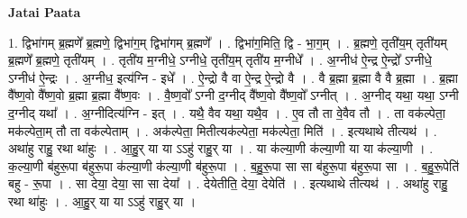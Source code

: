 \documentclass[17pt]{extarticle}
\begin{document}
\textbf{Jatai Paata} \newline

1. द्विभा॑गम् ब्र॒ह्मणे᳚ ब्र॒ह्मणे॒ द्विभा॑ग॒म् द्विभा॑गम् ब्र॒ह्मणे᳚ । . द्विभा॑ग॒मिति॒ द्वि - भा॒ग॒म् । . ब्र॒ह्मणे॒ तृती॑य॒म् तृती॑यम् ब्र॒ह्मणे᳚ ब्र॒ह्मणे॒ तृती॑यम् । . तृती॑य म॒ग्नीधे॒ ऽग्नीधे॒ तृती॑य॒म् तृती॑य म॒ग्नीधे᳚ । . अ॒ग्नीध॑ ऐ॒न्द्र ऐ॒न्द्रो᳚ ऽग्नीधे॒ ऽग्नीध॑ ऐ॒न्द्रः । . अ॒ग्नीध॒ इत्य॑ग्नि - इधे᳚ । . ऐ॒न्द्रो वै वा ऐ॒न्द्र ऐ॒न्द्रो वै । . वै ब्र॒ह्मा ब्र॒ह्मा वै वै ब्र॒ह्मा । . ब्र॒ह्मा वै᳚ष्ण॒वो वै᳚ष्ण॒वो ब्र॒ह्मा ब्र॒ह्मा वै᳚ष्ण॒वः । . वै॒ष्ण॒वो᳚ ऽग्नी द॒ग्नीद् वै᳚ष्ण॒वो वै᳚ष्ण॒वो᳚ ऽग्नीत् । . अ॒ग्नीद् यथा॒ यथा॒ ऽग्नी द॒ग्नीद् यथा᳚ । . अ॒ग्नीदित्य॑ग्नि - इत् । . यथै॒ वैव यथा॒ यथै॒व । . ए॒व तौ ता वे॒वैव तौ । . ता वक॑ल्पेता॒ मक॑ल्पेता॒म् तौ ता वक॑ल्पेताम् । . अक॑ल्पेता॒ मितीत्यक॑ल्पेता॒ मक॑ल्पेता॒ मिति॑ । . इत्यथाथे तीत्यथ॑ । . अथा॑हु राहु॒ रथा था॑हुः । . आ॒हु॒र् या या ऽऽहु॑ राहु॒र् या । . या क॑ल्या॒णी क॑ल्या॒णी या या क॑ल्या॒णी । . क॒ल्या॒णी ब॑हुरू॒पा ब॑हुरू॒पा क॑ल्या॒णी क॑ल्या॒णी ब॑हुरू॒पा । . ब॒हु॒रू॒पा सा सा ब॑हुरू॒पा ब॑हुरू॒पा सा । . ब॒हु॒रू॒पेति॑ बहु - रू॒पा । . सा देया॒ देया॒ सा सा देया᳚ । . देयेतीति॒ देया॒ देयेति॑ । . इत्यथाथे तीत्यथ॑ । . अथा॑हु राहु॒ रथा था॑हुः । . आ॒हु॒र् या या ऽऽहु॑ राहु॒र् या । \newline
\end{document}

